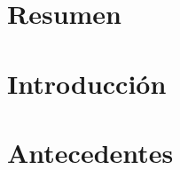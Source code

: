 \documentclass[a4page, 11pt, showtrims]{memoir}
\title{\izenburua}
\author{\egilea}
\date{\data}
\begin{document}
	
%




%
%
%

\cleardoublepage
\frontmatter


%


\chapter*{Resumen}

\cleardoublepage


\tableofcontents
\clearpage
\listoffigures
\clearpage
\listoftables
\clearpage
{}



\cleardoublepage
\mainmatter

\chapter{Introducción} \label{ch:chap1}

\clearpage
\chapter{Antecedentes} \label{ch:chap2}

\clearpage
\end{document}
